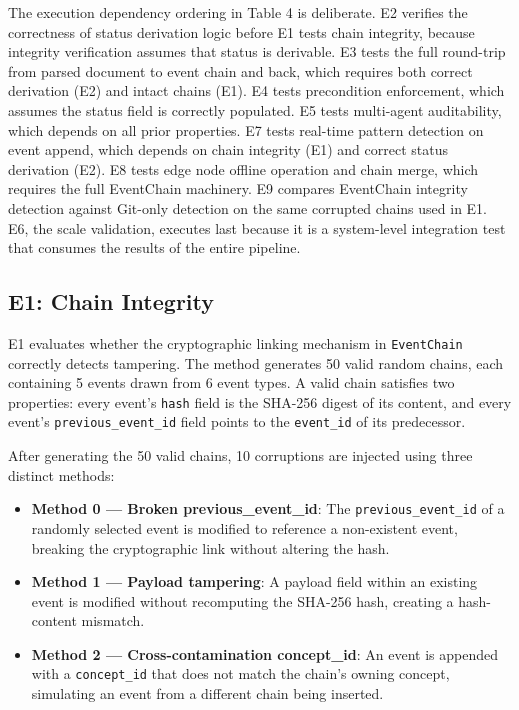 The execution dependency ordering in Table 4 is deliberate. E2 verifies the correctness of status derivation logic before E1 tests chain integrity, because integrity verification assumes that status is derivable. E3 tests the full round-trip from parsed document to event chain and back, which requires both correct derivation (E2) and intact chains (E1). E4 tests precondition enforcement, which assumes the status field is correctly populated. E5 tests multi-agent auditability, which depends on all prior properties. E7 tests real-time pattern detection on event append, which depends on chain integrity (E1) and correct status derivation (E2). E8 tests edge node offline operation and chain merge, which requires the full EventChain machinery. E9 compares EventChain integrity detection against Git-only detection on the same corrupted chains used in E1. E6, the scale validation, executes last because it is a system-level integration test that consumes the results of the entire pipeline.

\subsection{E1: Chain Integrity}\label{e1-chain-integrity}

E1 evaluates whether the cryptographic linking mechanism in \texttt{EventChain} correctly detects tampering. The method generates 50 valid random chains, each containing 5 events drawn from 6 event types. A valid chain satisfies two properties: every event's \texttt{hash} field is the SHA-256 digest of its content, and every event's \texttt{previous\_event\_id} field points to the \texttt{event\_id} of its predecessor.

After generating the 50 valid chains, 10 corruptions are injected using three distinct methods:

\begin{itemize}
\tightlist
\item
  \textbf{Method 0 --- Broken previous\_event\_id}: The \texttt{previous\_event\_id} of a randomly selected event is modified to reference a non-existent event, breaking the cryptographic link without altering the hash.
\item
  \textbf{Method 1 --- Payload tampering}: A payload field within an existing event is modified without recomputing the SHA-256 hash, creating a hash-content mismatch.
\item
  \textbf{Method 2 --- Cross-contamination concept\_id}: An event is appended with a \texttt{concept\_id} that does not match the chain's owning concept, simulating an event from a different chain being inserted.
\end{itemize}

